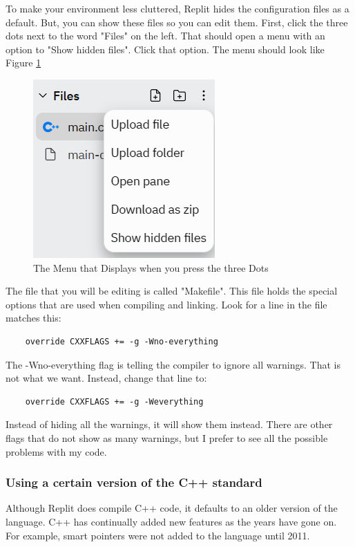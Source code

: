 To make your environment less cluttered, Replit hides the configuration files as a default. But, you can show these files so you can edit them. First, click the three dots next to the word "Files" on the left. That should open a menu with an option to "Show hidden files". Click that option. The menu should look like Figure \ref{fig:ShowHiddenMenu}

\begin{figure}[h]
    \centering
    \includegraphics{images/showhidden.PNG}
    \caption{The Menu that Displays when you press the three Dots}
    \label{fig:ShowHiddenMenu}
\end{figure}

The file that you will be editing is called "Makefile". This file holds the special options that are used when compiling and linking. Look for a line in the file matches this:

\begin{verbatim}
    override CXXFLAGS += -g -Wno-everything    
\end{verbatim}

The -Wno-everything flag is telling the compiler to ignore all warnings. That is not what we want. Instead, change that line to:

\begin{verbatim}
    override CXXFLAGS += -g -Weverything
\end{verbatim}

Instead of hiding all the warnings, it will show them instead. There are other flags that do not show as many warnings, but I prefer to see all the possible problems with my code.

\subsubsection{Using a certain version of the C++ standard}
\label{changestandard}
Although Replit does compile C++ code, it defaults to an older version of the language. C++ has continually added new features as the years have gone on. For example, smart pointers were not added to the language until 2011.


